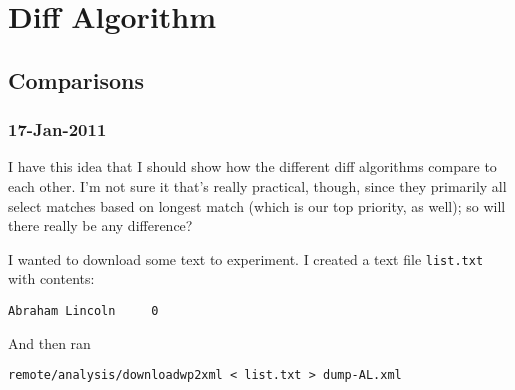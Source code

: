 \chapter{Diff Algorithm}

\section{Comparisons}

\subsection{17-Jan-2011}

I have this idea that I should show how the different
diff algorithms compare to each other.
I'm not sure it that's really practical, though, since
they primarily all select matches based on longest match
(which is our top priority, as well); so will there really be
any difference?

I wanted to download some text to experiment.
I created a text file \texttt{list.txt} with contents:
\begin{verbatim}
Abraham Lincoln     0
\end{verbatim}
And then ran
\begin{verbatim}
remote/analysis/downloadwp2xml < list.txt > dump-AL.xml
\end{verbatim}

